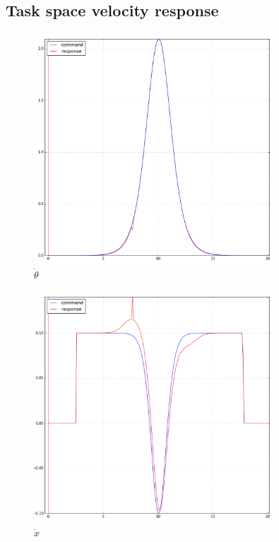 \subsection{Task space velocity response}
\begin{figure}[!h]
    \centering
    \includegraphics[width=0.8\textwidth]{Figures/360_t.png}
    \caption{$\dot{\theta}$}
    \label{fig:my_label}
\end{figure}

\begin{figure}[!h]
    \centering
    \includegraphics[width=0.8\textwidth]{Figures/360_x.png}
    \caption{$\dot{x}$}
    \label{fig:my_label}
\end{figure}

